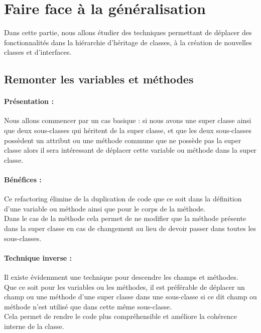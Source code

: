 \documentclass[a4paper,twoside,12pt,openright]{report}
\begin{document}
\newpage
\section{Faire face à la généralisation}
Dans cette partie, nous allons étudier des techniques permettant de déplacer des fonctionnalités dans la hiérarchie d'héritage de classes, à la création de nouvelles classes et d'interfaces.\\



\subsection{Remonter les variables et méthodes}
\paragraph{Présentation :}
Nous allons commencer par un cas basique : si nous avons une super classe ainsi que deux sous-classes qui héritent de la super classe, et que les deux sous-classes possèdent un attribut ou une méthode commune que ne possède pas la super classe alors il sera intéressant de déplacer cette variable ou méthode dans la super classe.\\

\paragraph{Bénéfices :}
Ce refactoring élimine de la duplication de code que ce soit dans la définition d'une variable ou méthode ainsi que pour le corps de la méthode.\\
Dans le cas de la méthode cela permet de ne modifier que la méthode présente dans la super classe en cas de changement au lieu de devoir passer dans toutes les sous-classes.\\

\paragraph{Technique inverse :}
Il existe évidemment une technique pour descendre les champs et méthodes.\\
Que ce soit pour les variables ou les méthodes, il est préférable de déplacer un champ ou une méthode d'une super classe dans une sous-classe si ce dit champ ou méthode n'est utilisé que dans cette même sous-classe.\\
Cela permet de rendre le code plus compréhensible et améliore la cohérence interne de la classe.\\
\end{document}
